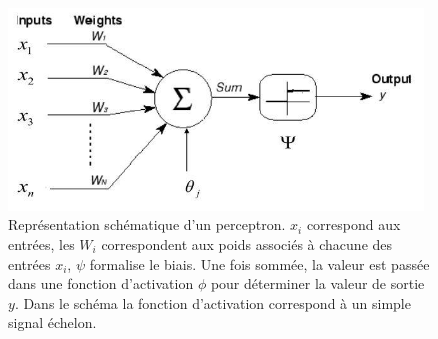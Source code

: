 \begin{figure}[h]
  \centering
  \includegraphics[width=11cm]{./Chapitre2/figures/perceptron.png}
  \caption{Représentation schématique d'un perceptron. $x_i$ correspond aux entrées, les $W_i$ correspondent aux poids associés à chacune des entrées $x_i$, $\psi$ formalise le biais. Une fois sommée, la valeur est passée dans une fonction d'activation $\phi$ pour déterminer la valeur de sortie $y$. Dans le schéma la fonction d'activation correspond à un simple signal échelon.}
  \label{fig:perceptron}
\end{figure}
